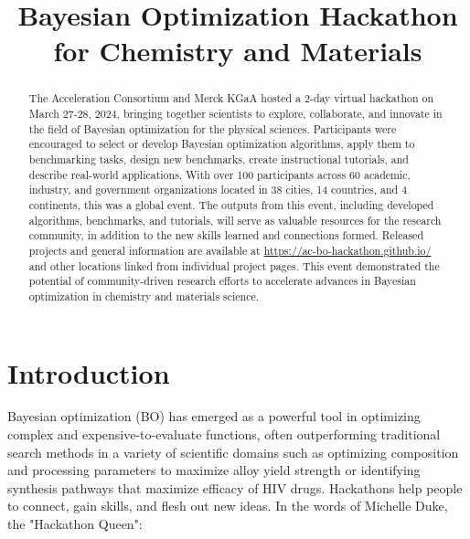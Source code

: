 \documentclass[superscriptaddress, nofootinbib,  amsmath, amssymb, preprint]{revtex4-2}
\begin{document}
\title{Bayesian Optimization Hackathon for Chemistry and Materials}

% 




\begin{abstract}
The Acceleration Consortium and Merck KGaA hosted a 2-day virtual hackathon on March 27-28, 2024, bringing together scientists to explore, collaborate, and innovate in the field of Bayesian optimization for the physical sciences. Participants were encouraged to select or develop Bayesian optimization algorithms, apply them to benchmarking tasks, design new benchmarks, create instructional tutorials, and describe real-world applications. With over 100 participants across 60 academic, industry, and government organizations located in 38 cities, 14 countries, and 4 continents, this was a global event. %
The outputs from this event, including developed algorithms, benchmarks, and tutorials, will serve as valuable resources for the research community, in addition to the new skills learned and connections formed. Released projects and general information are available at \url{https://ac-bo-hackathon.github.io/} and other locations linked from individual project pages. This event demonstrated the potential of community-driven research efforts to accelerate advances in Bayesian optimization in chemistry and materials science.
\end{abstract}

\maketitle



\section{Introduction}

Bayesian optimization (BO) has emerged as a powerful tool in optimizing complex and expensive-to-evaluate functions, often outperforming traditional search methods in a variety of scientific domains such as optimizing composition and processing parameters to maximize alloy yield strength or identifying synthesis pathways that maximize efficacy of HIV drugs. Hackathons help people to connect, gain skills, and flesh out new ideas. In the words of Michelle Duke, the "Hackathon Queen":
\end{document}
